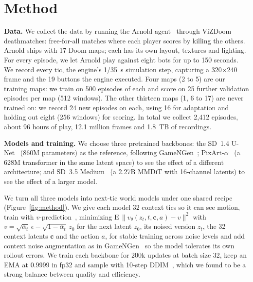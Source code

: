 \documentclass{article}
\newif\ifwithappendix \withappendixfalse %
\newcommand{\apppar}[1]{\ifwithappendix\ (Appendix~\ref{#1})\fi} %
\begin{document}

\section{Method}
\label{sec:bench}

\textbf{Data.} We collect the data by running the Arnold agent~\citep{lample2017arnold} through ViZDoom~\citep{kempka2016vizdoom} deathmatches: free-for-all matches where each player scores by killing the others. Arnold ships with 17 Doom maps; each has its own layout, textures and lighting. For every episode, we let Arnold play against eight bots for up to 150 seconds. We record every tic, the engine's 1/35~s simulation step, capturing a 320$\times$240 frame and the 19 buttons the engine executed. Four maps (2 to 5) are our training maps: we train on 500 episodes of each and score on 25 further validation episodes per map (512 windows). The other thirteen maps (1, 6 to 17) are never trained on: we record 24 new episodes on each, using 16 for adaptation and holding out eight (256 windows) for scoring. In total we collect 2,412 episodes, about 96 hours of play, 12.1 million frames and 1.8~TB of recordings.

\textbf{Models and training.} We choose three pretrained backbones: the SD~1.4 U-Net~\citep{rombach2022ldm} (860M parameters) as the reference, following GameNGen~\citep{valevski2024gamengen}; PixArt-$\alpha$~\citep{chen2023pixart} (a 628M transformer in the same latent space) to see the effect of a different architecture; and SD~3.5 Medium~\citep{esser2024sd3} (a 2.27B MMDiT with 16-channel latents) to see the effect of a larger model.

We turn all three models into next-tic world models under one shared recipe (Figure~\ref{fig:method}). We give each model 32 context tics so it can see motion, train with $v$-prediction~\citep{salimans2022progressive}, minimizing $\mathrm{E}\,\|v_\theta(z_t, t, \mathbf{c}, a) - v\|^2$ with $v = \sqrt{\bar\alpha_t}\,\epsilon - \sqrt{1-\bar\alpha_t}\,z_0$ for the next latent $z_0$, its noised version $z_t$, the 32 context latents $\mathbf{c}$ and the action $a$, for stable training across noise levels and add context noise augmentation as in GameNGen~\citep{valevski2024gamengen} so the model tolerates its own rollout errors. We train each backbone for 200k updates at batch size 32, keep an EMA at 0.9999 in fp32 and sample with 10-step DDIM~\citep{song2021ddim}, which we found to be a strong balance between quality and efficiency\apppar{app:protocol}.  
\end{document}
